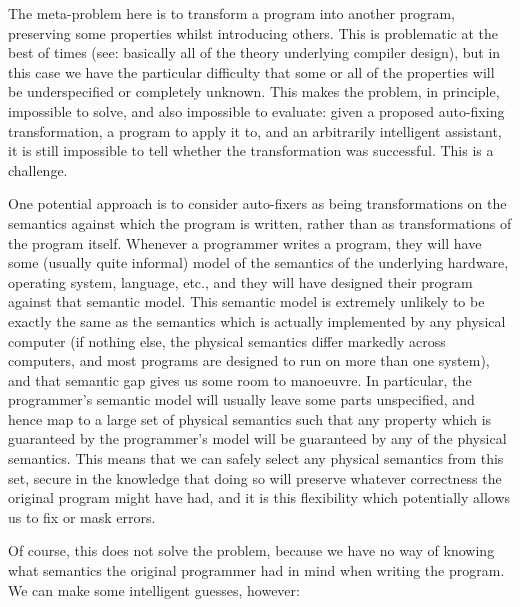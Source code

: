 The meta-problem here is to transform a program into another program,
preserving some properties whilst introducing others.  This is
problematic at the best of times (see: basically all of the theory
underlying compiler design), but in this case we have the particular
difficulty that some or all of the properties will be underspecified
or completely unknown.  This makes the problem, in principle,
impossible to solve, and also impossible to evaluate: given a proposed
auto-fixing transformation, a program to apply it to, and an
arbitrarily intelligent assistant, it is still impossible to tell
whether the transformation was successful.  This is a
challenge.

One potential approach is to consider auto-fixers as being
transformations on the semantics against which the program is written,
rather than as transformations of the program itself.  Whenever a
programmer writes a program, they will have some (usually quite
informal) model of the semantics of the underlying hardware, operating
system, language, etc., and they will have designed their program
against that semantic model.  This semantic model is extremely
unlikely to be exactly the same as the semantics which is actually
implemented by any physical computer (if nothing else, the physical
semantics differ markedly across computers, and most programs are
designed to run on more than one system), and that semantic gap gives
us some room to manoeuvre.  In particular, the programmer's semantic
model will usually leave some parts unspecified, and hence map to a
large set of physical semantics such that any property which is
guaranteed by the programmer's model will be guaranteed by any of the
physical semantics.  This means that we can safely select any physical
semantics from this set, secure in the knowledge that doing so will
preserve whatever correctness the original program might have had, and
it is this flexibility which potentially allows us to fix or mask
errors.

Of course, this does not solve the problem, because we have no way of
knowing what semantics the original programmer had in mind when
writing the program.  We can make some intelligent guesses, however:

